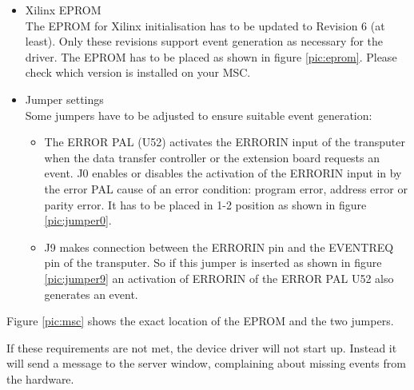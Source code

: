 \begin{itemize}

  \item Xilinx EPROM \\
        The EPROM for Xilinx initialisation has to be updated to Revision 6
        (at least). Only these revisions support event generation as necessary
        for the driver. The EPROM has to be placed as shown in figure
        \ref{pic:eprom}. Please check which version is installed on your MSC.

        

  \item Jumper settings \\
        Some jumpers have to be adjusted to ensure suitable event generation:

        \begin{itemize}

          \item The ERROR PAL (U52) activates the ERRORIN input
                of the transputer when the data transfer controller or the
                extension board requests an event. J0 enables or disables the
                activation of the ERRORIN input in by the error PAL cause of 
                an error condition: program error, address error or parity 
                error. It has to be placed in 1-2 position as shown in figure
                \ref{pic:jumper0}.

                

          \item J9 makes connection between the ERRORIN pin and the
                EVENTREQ pin of the transputer. So if this
                jumper is inserted as shown in figure \ref{pic:jumper9} an
                activation of ERRORIN of the ERROR PAL U52 also generates an
                event.

                

        \end{itemize}

\end{itemize}

Figure \ref{pic:msc} shows the exact location of the EPROM and the two jumpers.



If these requirements are not met, the device driver will not start up.
Instead it will send a message to the server window, complaining about 
missing events from the hardware.

